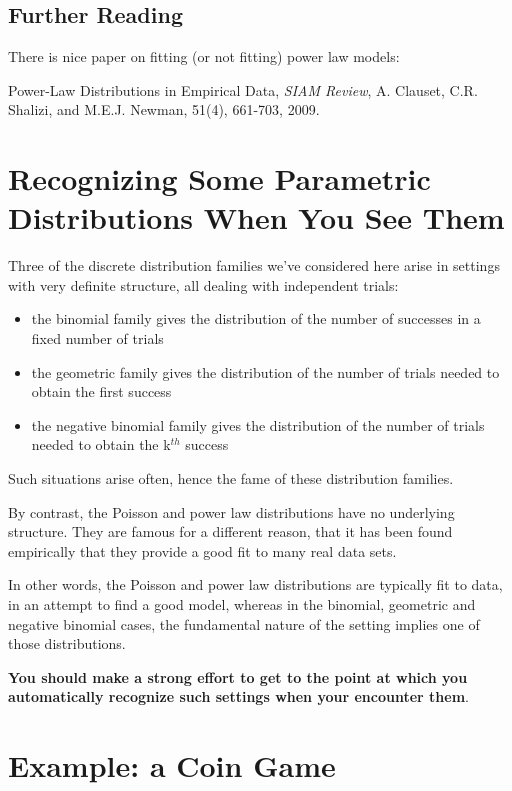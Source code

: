\subsection{Further Reading}

There is nice paper on fitting (or not fitting) power law models:

Power-Law Distributions in Empirical Data, {\it SIAM Review}, A.
Clauset, C.R. Shalizi, and M.E.J. Newman, 51(4), 661-703, 2009.

\section{Recognizing Some Parametric Distributions When You See Them}

Three of the discrete distribution families we've considered here arise
in settings with very definite structure, all dealing with independent
trials:

\begin{itemize}

\item the binomial family gives the distribution of the number of
successes in a fixed number of trials

\item the geometric family gives the distribution of the number of
trials needed to obtain the first success

\item the negative binomial family gives the distribution of the number of
trials needed to obtain the k$^{th}$ success

\end{itemize}

Such situations arise often, hence the fame of these distribution
families.

By contrast, the Poisson and power law distributions have no underlying
structure.  They are famous for a different reason, that it has been
found empirically that they provide a good fit to many real data sets.

In other words, the Poisson and power law distributions are typically
fit to data, in an attempt to find a good model, whereas in the binomial,
geometric and negative binomial cases, the fundamental nature of the
setting implies one of those distributions.

{\bf You should make a strong effort to get to the point at which you
automatically recognize such settings when your encounter them}.

\section{Example:  a Coin Game}
\label{coingame}

